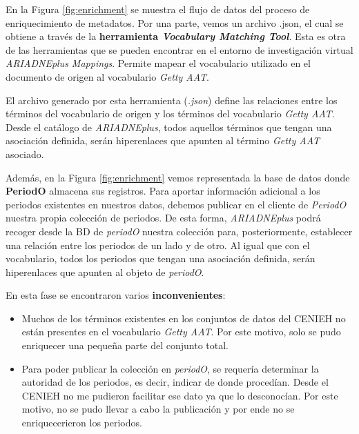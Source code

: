 En la Figura \ref{fig:enrichment} se muestra el flujo de datos del proceso de
enriquecimiento de metadatos. Por una parte, vemos un archivo .json, el
cual se obtiene a través de la \textbf{herramienta \emph{Vocabulary Matching
Tool}}. Esta es otra de las herramientas que se pueden encontrar en el
entorno de investigación virtual \emph{ARIADNEplus Mappings}. Permite mapear el vocabulario utilizado
en el documento de origen al vocabulario \emph{Getty AAT}.


El archivo generado por esta herramienta (\emph{.json}) define las relaciones
entre los términos del vocabulario de origen y los términos del
vocabulario \emph{Getty AAT}. Desde el catálogo de \emph{ARIADNEplus}, todos
aquellos términos que tengan una asociación definida, serán hiperenlaces
que apunten al término \emph{Getty AAT} asociado.


Además, en la Figura \ref{fig:enrichment} vemos representada la base de datos donde \textbf{PeriodO} almacena sus registros. Para aportar información adicional a los periodos existentes
en nuestros datos, debemos publicar en el cliente de \emph{PeriodO} nuestra
propia colección de periodos. De esta forma, \emph{ARIADNEplus} podrá recoger
desde la BD de \emph{periodO} nuestra colección para, posteriormente,
establecer una relación entre los periodos de un lado y de otro. Al
igual que con el vocabulario, todos los periodos que tengan una
asociación definida, serán hiperenlaces que apunten al objeto de
\emph{periodO}.


En esta fase se encontraron varios \textbf{inconvenientes}: 

\begin{itemize}
\tightlist
\item
  Muchos de los términos existentes en los conjuntos de datos del CENIEH no están
  presentes en el vocabulario \emph{Getty AAT}. Por este motivo, solo se
  pudo enriquecer una pequeña parte del conjunto total.
\item
  Para poder publicar la colección en \emph{periodO}, se requería determinar la autoridad de
  los periodos, es decir, indicar de donde procedían. Desde el CENIEH no
  me pudieron facilitar ese dato ya que lo desconocían. Por este motivo,
  no se pudo llevar a cabo la publicación y por ende no se enriquecerieron
  los periodos.
\end{itemize}

